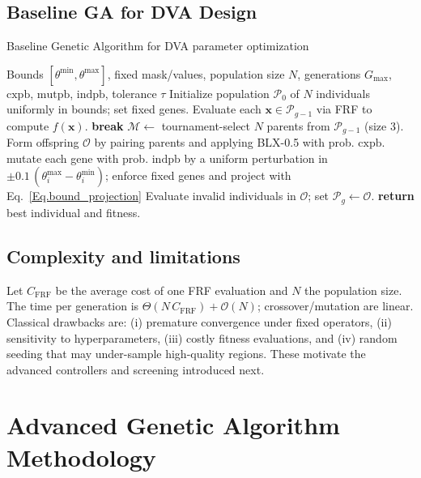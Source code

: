 \documentclass[12pt,a4paper]{article}
\begin{document}
    \subsection{Baseline GA for DVA Design}
    \begin{algorithm}[H]
    \caption{Baseline Genetic Algorithm for DVA parameter optimization}
    \begin{algorithmic}[1]
    \REQUIRE Bounds $[\theta^{\min},\theta^{\max}]$, fixed mask/values, population size $N$, generations $G_{\max}$, $\text{cxpb}$, $\text{mutpb}$, $\text{indpb}$, tolerance $\tau$
    \STATE Initialize population $\mathcal{P}_0$ of $N$ individuals uniformly in bounds; set fixed genes.
        \STATE Evaluate each $\mathbf{x}\in\mathcal{P}_{g-1}$ via FRF to compute $f(\mathbf{x})$.
         \textbf{break} \ENDIF
        \STATE $\mathcal{M}\leftarrow$ tournament-select $N$ parents from $\mathcal{P}_{g-1}$ (size 3).
        \STATE Form offspring $\mathcal{O}$ by pairing parents and applying BLX-0.5 with prob. $\text{cxpb}$.
             mutate each gene with prob. $\text{indpb}$ by a uniform perturbation in $\pm 0.1\,(\theta_i^{\max}-\theta_i^{\min})$; enforce fixed genes and project with Eq.~\eqref{Eq.bound_projection} \ENDIF
        \ENDFOR
        \STATE Evaluate invalid individuals in $\mathcal{O}$; set $\mathcal{P}_g\leftarrow\mathcal{O}$.
    \ENDFOR
    \STATE \textbf{return} best individual and fitness.
    \end{algorithmic}
    \end{algorithm}

    \subsection{Complexity and limitations}
    Let $C_{\text{FRF}}$ be the average cost of one FRF evaluation and $N$ the population size. The time per generation is $\Theta(N\,C_{\text{FRF}})+\mathcal{O}(N)$; crossover/mutation are linear. Classical drawbacks are: (i) premature convergence under fixed operators, (ii) sensitivity to hyperparameters, (iii) costly fitness evaluations, and (iv) random seeding that may under-sample high-quality regions. These motivate the advanced controllers and screening introduced next.




\section{Advanced Genetic Algorithm Methodology}
\end{document}
